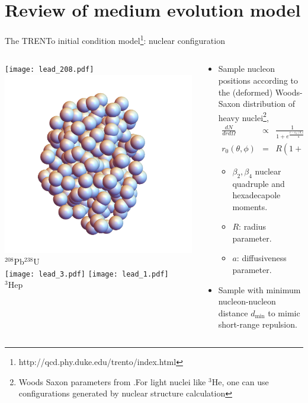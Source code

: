 \documentclass[11pt, aspectratio=169]{beamer}
\begin{document}
\section{Review of medium evolution model}
\begin{frame}{The TRENTo initial condition model\footnote{http://qcd.phy.duke.edu/trento/index.html}: nuclear configuration}
\begin{columns}
\begin{column}[c]{.35\textwidth}
\begin{center}
\texttt{[image: lead\_208.pdf]}
\includegraphics[width=.5\textwidth]{U_238.png}\\
{${}^{208}$Pb\quad\quad\quad\quad ${}^{238}$U}\\
\texttt{[image: lead\_3.pdf]}
\texttt{[image: lead\_1.pdf]}\\
{${}^{3}$He\quad\quad\quad\quad\quad p}
\end{center}
\end{column}
\begin{column}[c]{.65\textwidth}
\begin{itemize}
\item Sample nucleon positions according to the (deformed) Woods-Saxon distribution of heavy nuclei\footnote{Woods Saxon parameters from .For light nuclei like ${}^3$He, one can use configurations generated by nuclear structure calculation}, 
\begin{eqnarray}
\nonumber
\frac{dN}{dr d\Omega} &\propto& \frac{1}{1+e^{\frac{r-r_0(\theta, \phi))}{a}}},
\\\nonumber
r_0(\theta, \phi) &=& R(1+\beta_2 Y_{20} + \beta_4 Y_{40})
\end{eqnarray}
\begin{itemize}
\item $\beta_2, \beta_4$ nuclear quadruple and hexadecapole moments.
\item $R$: radius parameter.
\item $a$: diffusiveness parameter.
\end{itemize}
\item Sample with minimum nucleon-nucleon distance $d_{\min}$ to mimic short-range repulsion.
\end{itemize}
\end{column}
\end{columns}
\end{frame}
\end{document}
